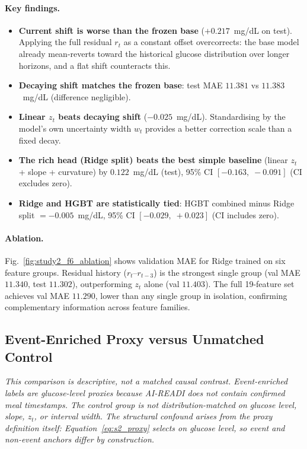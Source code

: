 \paragraph{Key findings.}
\begin{itemize}
  \item \textbf{Current shift is worse than the frozen base} ($+0.217$~mg/dL
        on test).
        Applying the full residual $r_t$ as a constant offset overcorrects:
        the base model already mean-reverts toward the historical glucose
        distribution over longer horizons, and a flat shift counteracts this.
  \item \textbf{Decaying shift matches the frozen base}: test MAE
        $11.381$ vs $11.383$~mg/dL (difference negligible).
  \item \textbf{Linear $z_t$ beats decaying shift} ($-0.025$~mg/dL).
        Standardising by the model's own uncertainty width $w_t$ provides
        a better correction scale than a fixed decay.
  \item \textbf{The rich head (Ridge split) beats the best simple baseline}
        (linear $z_t$ + slope + curvature) by $0.122$~mg/dL (test),
        95\% CI $[-0.163,\;-0.091]$ (CI excludes zero).
  \item \textbf{Ridge and HGBT are statistically tied}: HGBT combined minus
        Ridge split $= -0.005$~mg/dL, 95\% CI $[-0.029,\;+0.023]$
        (CI includes zero).
\end{itemize}

\paragraph{Ablation.}
Fig.~\ref{fig:study2_f6_ablation} shows validation MAE for Ridge trained on
six feature groups.
Residual history ($r_t$--$r_{t-3}$) is the strongest single group
(val MAE $11.340$, test $11.302$), outperforming $z_t$ alone (val $11.403$).
The full 19-feature set achieves val MAE $11.290$, lower than any single group
in isolation, confirming complementary information across feature families.

\subsection{Event-Enriched Proxy versus Unmatched Control}
\label{subsec:study2_event}

\emph{This comparison is descriptive, not a matched causal contrast.
Event-enriched labels are glucose-level proxies because AI-READI does not
contain confirmed meal timestamps.
The control group is not distribution-matched on glucose level, slope,
$z_t$, or interval width.
The structural confound arises from the proxy definition itself:
Equation~\eqref{eq:s2_proxy} selects on glucose level, so event and
non-event anchors differ by construction.}


